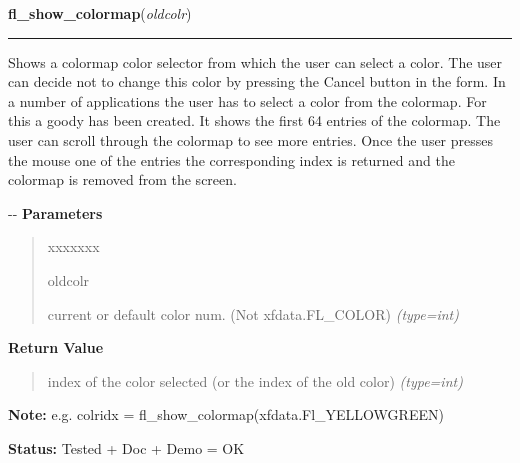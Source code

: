 \hspace{.8\funcindent}\begin{boxedminipage}{\funcwidth}

    \raggedright \textbf{fl\_show\_colormap}(\textit{oldcolr})

    \vspace{-1.5ex}

    \rule{\textwidth}{0.5\fboxrule}
\setlength{\parskip}{2ex}

Shows a colormap color selector from which the user can select a
color. The user can decide not to change this color by pressing the
Cancel button in the form. In a number of applications the user has
to select a color from the colormap. For this a goody has been created.
It shows the first 64 entries of the colormap. The user can scroll
through the colormap to see more entries. Once the user presses the
mouse one of the entries the corresponding index is returned and the
colormap is removed from the screen.

-{}-
\setlength{\parskip}{1ex}
      \textbf{Parameters}
      \vspace{-1ex}

      \begin{quote}
        \begin{Ventry}{xxxxxxx}

          \item[oldcolr]


current or default color num. (Not xfdata.FL\_COLOR)
            {\it (type=int)}

        \end{Ventry}

      \end{quote}

      \textbf{Return Value}
    \vspace{-1ex}

      \begin{quote}

index of the color selected (or the index of the old color)
      {\it (type=int)}

      \end{quote}

\textbf{Note:} 
e.g. colridx = fl\_show\_colormap(xfdata.Fl\_YELLOWGREEN)


\textbf{Status:} 
Tested + Doc + Demo = OK


    \end{boxedminipage}

    \label{xformslib:flgoodies:fl_show_choices}

